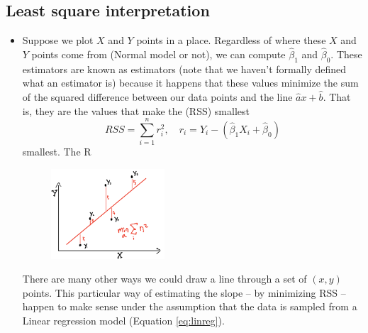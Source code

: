 \subsection{Least square interpretation}
\begin{itemize}
\item Suppose we plot $X$  and $Y$ points in a place. Regardless of where these $X$ and $Y$ points come from (Normal model or not), we can compute $\hat{\beta}_1$ and $\hat{\beta}_0$. 
These estimators are known as  estimators (note that we haven't formally defined what an estimator is) because  it happens that these values minimize the sum of the squared difference between our data points and the line $\hat{a}x + \hat{b}$. That is, they are the values that make the (RSS) smallest
\begin{equation*}
RSS = \sum_{i=1}^n r_i^2,\quad r_i  = Y_i - (\hat{\beta}_1X_i + \hat{\beta}_0)
\end{equation*}
smallest. The R

\begin{figure}[h]
\centering
\includegraphics[width=0.4\textwidth]{./../figures/rss}
\caption{ }\label{rss}
\end{figure}


There are many other ways we could draw a line through a set of $(x,y)$ points. This particular way of estimating the slope -- by minimizing RSS -- happen to make sense under the assumption that  the data is sampled from a Linear regression model (Equation \ref{eq:linreg}). 


\end{itemize}
